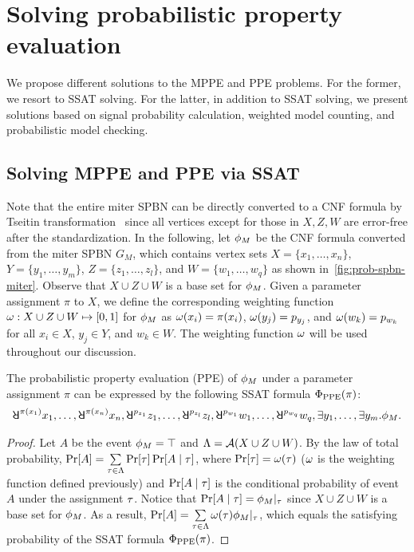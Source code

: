 \section{Solving probabilistic property evaluation}
\label{sect:prob-solutions}

We propose different solutions to the MPPE and PPE problems.
For the former, we resort to SSAT solving.
For the latter, in addition to SSAT solving,
we present solutions based on signal probability calculation,
weighted model counting,
and probabilistic model checking.

\subsection{Solving MPPE and PPE via SSAT}
Note that the entire miter SPBN can be directly converted to a CNF formula by Tseitin transformation~\cite{Tseitin1983}
since all vertices except for those in $X,Z,W$ are error-free after the standardization.
In the following,
let $\phi_M$ be the CNF formula converted from the miter SPBN $G_M$,
which contains vertex sets
$X=\{x_1,\ldots,x_n\}$,
$Y=\{y_1,\ldots,y_m\}$,
$Z=\{z_1,\ldots,z_l\}$, and
$W=\{w_1,\ldots,w_q\}$ as shown in~\cref{fig:prob-spbn-miter}.
Observe that $X \cup Z \cup W$ is a base set for $\phi_M$.
Given a parameter assignment $\pi$ to $X$,
we define the corresponding weighting function $\omega:X\cup Z\cup W\mapsto[0,1]$ for $\phi_M$ as
$\omega(x_i)=\pi(x_i)$,
$\omega(y_j)=p_{y_j}$, and
$\omega(w_k)=p_{w_k}$ for all
$x_i \in X$,
$y_j \in Y$, and
$w_k \in W$.
The weighting function $\omega$ will be used throughout our discussion.

\begin{theorem}
    \label{thm:prob-ppe-ssat}
    The probabilistic property evaluation (PPE) of $\phi_M$ under a parameter assignment $\pi$ can be expressed
    by the following SSAT formula $\Phi_\mathrm{PPE}(\pi)$:
    \begin{align}
        \label{eq:prob-ppe-ssat}
        \random{\pi(x_1)}x_1,\ldots,\random{\pi(x_n)}x_n,
        \random{p_{z_1}}z_1,\ldots,\random{p_{z_l}}z_l,
        \random{p_{w_1}}w_1,\ldots,\random{p_{w_q}}w_q,
        \exists y_1,\ldots,\exists y_m.
        \pf_M.
    \end{align}
\end{theorem}
\begin{proof}
    Let $A$ be the event $\phi_M=\top$ and $\Lambda=\mathcal{A}(X \cup Z \cup W)$.
    By the law of total probability,
    $\Pr[A]=\sum\limits_{\tau\in\Lambda}\Pr[\tau]\Pr[A\mid\tau]$,
    where $\Pr[\tau]=\omega(\tau)$ ($\omega$ is the weighting function defined previously) and
    $\Pr[A\mid\tau]$ is the conditional probability of event $A$ under the assignment $\tau$.
    Notice that $\Pr[A\mid\tau]=\phi_M|_{\tau}$ since
    $X \cup Z \cup W$ is a base set for $\phi_M$.
    As a result,
    $\Pr[A]=\sum\limits_{\tau\in\Lambda}\omega(\tau)\phi_M|_{\tau}$,
    which equals the satisfying probability of the SSAT formula $\Phi_\mathrm{PPE}(\pi)$.
\end{proof}

